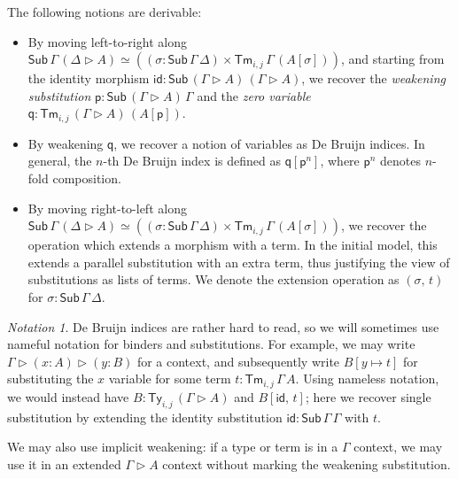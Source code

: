 \documentclass[acmsmall,anonymous,review]{acmart}
\newcommand{\msf}[1]{\mathsf{#1}}
\newcommand{\ext}{\triangleright}
\newcommand{\Sub}{\msf{Sub}}
\newcommand{\Ty}{\msf{Ty}}
\newcommand{\Tm}{\msf{Tm}}
\newcommand{\p}{\mathsf{p}}
\newcommand{\q}{\mathsf{q}}
\newcommand{\id}{\msf{id}}
\theoremstyle{remark}
\newtheorem{notation}{Notation}
\begin{document}

The following notions are derivable:
\begin{itemize}
\item
  By moving left-to-right along $\Sub\,\Gamma\,(\Delta\ext A) \simeq ((\sigma :
  \Sub\,\Gamma\,\Delta) \times \Tm_{i,j}\,\Gamma\,(A[\sigma]))$,
  and starting from the identity morphism $\id : \Sub\,(\Gamma\ext A)\,(\Gamma\ext A)$, we recover
  the \emph{weakening substitution} $\p : \Sub\,(\Gamma\ext A)\,\Gamma$ and the \emph{zero variable}
  $\q : \Tm_{i,j}\,(\Gamma\ext A)\,(A[\p])$.
\item
  By weakening $\q$, we recover a notion of variables as De Bruijn
  indices. In general, the $n$-th De Bruijn index is defined as $\q[\p^{n}]$,
  where $\p^{n}$ denotes $n$-fold composition.
\item
  By moving right-to-left along $\Sub\,\Gamma\,(\Delta\ext A) \simeq ((\sigma :
  \Sub\,\Gamma\,\Delta) \times \Tm_{i,j}\,\Gamma\,(A[\sigma]))$, we recover the
  operation which extends a morphism with a term. In the initial model, this
  extends a parallel substitution with an extra term, thus justifying the view
  of substitutions as lists of terms. We denote the extension operation as
  $(\sigma,\,t)$ for $\sigma : \Sub\,\Gamma\,\Delta$.
\end{itemize}

\begin{notation}
De Bruijn indices are rather hard to read, so we will sometimes use nameful notation
for binders and substitutions. For example, we may write $\Gamma \ext (x : A)
\ext (y : B)$ for a context, and subsequently write $B[y \mapsto t]$ for
substituting the $x$ variable for some term $t : \Tm_{i,j}\,\Gamma\,A$. Using
nameless notation, we would instead have $B : \Ty_{i,j}\,(\Gamma \ext A)$ and
$B[\id,\,t]$; here we recover single substitution by extending the identity
substitution $\id : \Sub\,\Gamma\,\Gamma$ with $t$.

We may also use implicit weakening: if a type or term is in a $\Gamma$ context,
we may use it in an extended $\Gamma \ext A$ context without marking the
weakening substitution.
\end{notation}
\end{document}
